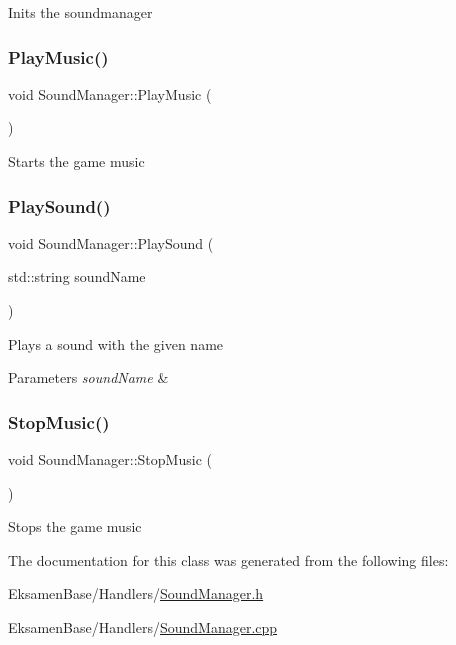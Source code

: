 Inits the soundmanager 

\mbox{\label{class_sound_manager_ab4f6bc3b9c203232424b10da9912cf1b}} 
\subsubsection{\texorpdfstring{Play\+Music()}{PlayMusic()}}
{\footnotesize\ttfamily void Sound\+Manager\+::\+Play\+Music (\begin{DoxyParamCaption}{ }\end{DoxyParamCaption})}



Starts the game music 

\mbox{\label{class_sound_manager_af84f2acbde4d8c0d8f5b47c2d917e486}} 
\subsubsection{\texorpdfstring{Play\+Sound()}{PlaySound()}}
{\footnotesize\ttfamily void Sound\+Manager\+::\+Play\+Sound (\begin{DoxyParamCaption}\item[{std\+::string}]{sound\+Name }\end{DoxyParamCaption})}



Plays a sound with the given name 


\begin{DoxyParams}{Parameters}
{\em sound\+Name} & \\
\hline
\end{DoxyParams}
\mbox{\label{class_sound_manager_a8b26fc4974bebd09b4bd7e108e8394ae}} 
\subsubsection{\texorpdfstring{Stop\+Music()}{StopMusic()}}
{\footnotesize\ttfamily void Sound\+Manager\+::\+Stop\+Music (\begin{DoxyParamCaption}{ }\end{DoxyParamCaption})}



Stops the game music 



The documentation for this class was generated from the following files\+:\begin{DoxyCompactItemize}
\item 
Eksamen\+Base/\+Handlers/\mbox{\hyperlink{_sound_manager_8h}{Sound\+Manager.\+h}}\item 
Eksamen\+Base/\+Handlers/\mbox{\hyperlink{_sound_manager_8cpp}{Sound\+Manager.\+cpp}}\end{DoxyCompactItemize}
